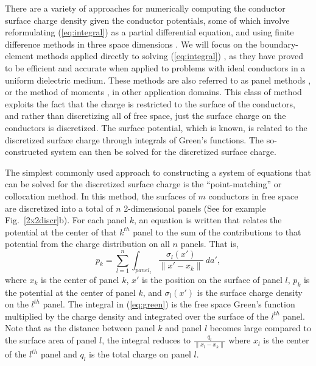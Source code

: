 There are a variety of approaches for numerically computing the
conductor surface charge density given the conductor potentials, some
of which involve reformulating   (\ref{eq:integral}) as a partial
differential equation, and using finite difference methods
in three space dimensions \cite{zem,gue}.  We will focus on the
boundary-element methods applied directly to solving  
(\ref{eq:integral})  \cite{rue,rao,Nin}, as they have proved to be
efficient and accurate when applied to problems with ideal conductors
in a uniform dielectric medium.  
These
methods are also referred to as panel methods  \cite{hes}, or the method
of moments  \cite{har}, in other application domains.  This class of
method exploits the fact that the charge is restricted to the surface
of the conductors, and rather than discretizing all of free space,
just the surface charge on the conductors is discretized.  The surface
potential, which is known, is related to the discretized surface
charge through integrals of Green's functions.  The so-constructed
system can then be solved for the discretized surface charge.

The simplest commonly used approach to constructing a
system of equations that can be solved for the discretized surface
charge is the ``point-matching'' or collocation method.  In this
method, the surfaces of $ m $ conductors in free space are discretized
into a total of $ n $ 2-dimensional panels
(See for example Fig.~\ref{2x2discr}b).
For each
panel $ k $, an equation is written that relates the potential at the
center of that $ k^{th} $ panel to the sum of the contributions to that
potential from the charge distribution on all $ n $ panels.  That is,
\begin{equation}
p_k = 
\sum_{l=1}^n \int_{panel_l} \frac{\sigma_l(x')}{\| x' - x_k \| } \: da',
\label{eq:green}
\end{equation}
where $ x_k $ is the center of panel $ k $, 
$ x' $ is the position on the surface of panel $ l $, $ p_k $ is the
potential at the center of panel $ k $, and $ \sigma_l(x')$ is the surface
charge density on the $ l^{th} $ panel.  The
integral in (\ref{eq:green}) is the free space Green's function
multiplied by the charge density and integrated over the surface of the $
l^{th} $ panel. Note that as the distance between panel $ k $ and panel $
l $ becomes large compared to the surface area of panel $ l $, the
integral reduces to $ \frac{q_l}{\| x_l - x_k \| } $
where $ x_l $ is the center of the $ l^{th} $ panel and 
$ q_l $ is the total charge on panel $ l $.


